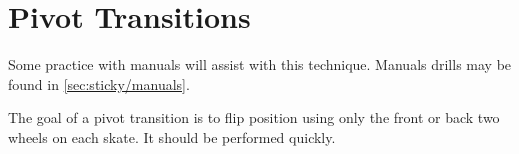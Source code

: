 \section{Pivot Transitions}
\label{sec:transitions/pivot}

Some practice with manuals will assist with this technique.
Manuals drills may be found in \ref{sec:sticky/manuals}.


The goal of a pivot transition is to flip position using only the front or back two wheels on each skate.  
It should be performed quickly.


\
